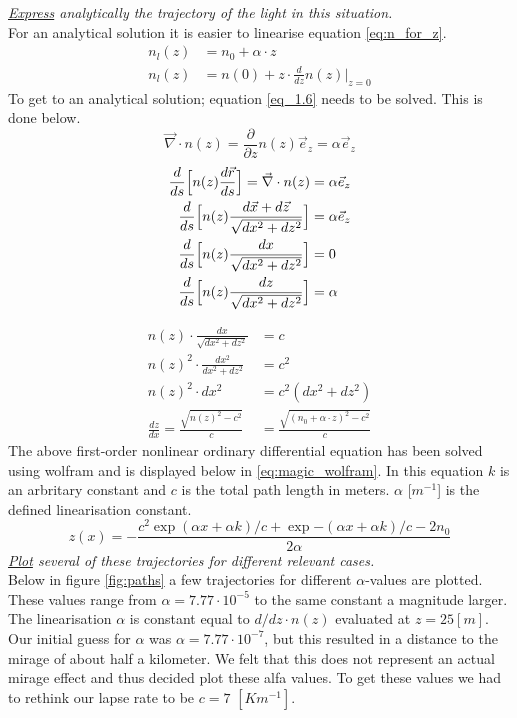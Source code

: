 \documentclass{article}
\begin{document}
\textit{\underline{Express} analytically the trajectory of the light in this situation.}\\
For an analytical solution it is easier to linearise equation \ref{eq:n_for_z}.
\begin{align*}
	n_l(z) &= n_0 + \alpha \cdot z\\
	n_l(z) &= n(0) +z \cdot \frac{d}{dz}n(z)\rvert_{z=0}
\end{align*}
To get to an analytical solution; equation \ref{eq_1.6} needs to be solved. This is done below.
\begin{equation*}
	\vec{\nabla} \cdot n(z) = \frac{\partial}{\partial z}n(z) \vec{e}_z = \alpha \vec{e}_z
\end{equation*}
\begin{align*}
	\frac{d}{ds} \Bigl[n(z)\frac{d\vec{r}}{ds}\Bigr] = \vec{\nabla}\cdot n(z) &= \alpha \vec{e}_z\\
	\frac{d}{ds} \Bigl[n(z)\frac{d\vec{x}+d\vec{z}}{\sqrt{dx^2 + dz^2}}\Bigr] &= \alpha \vec{e}_z\\
	\frac{d}{ds} \Bigl[n(z)\frac{dx}{\sqrt{dx^2 + dz^2}}\Bigr] &= 0\\
	\frac{d}{ds} \Bigl[n(z)\frac{dz}{\sqrt{dx^2 + dz^2}}\Bigr] &= \alpha\\
\end{align*}

\begin{align*}
	n(z)\cdot \frac{dx}{\sqrt{dx^2 + dz^2}} &= c\\
	n(z)^2 \cdot \frac{dx^2}{dx^2 + dz^2} &= c^2\\
	n(z)^2 \cdot dx^2 &= c^2(dx^2 + dz^2)\\
	\frac{dz}{dx} = \frac{\sqrt{n(z)^2 -c^2}}{c} &= \frac{\sqrt{(n_0+\alpha\cdot z)^2 -c^2}}{c}
\end{align*}
The above first-order nonlinear ordinary differential equation has been solved using wolfram and is displayed below in \ref{eq:magic_wolfram}. In this equation $k$ is an arbritary constant and $c$ is the total path length in meters. $\alpha$ [$m^{-1}$] is the defined linearisation constant.
\begin{equation}
	z(x)=-\frac{c^2 \exp{(\alpha x + \alpha k)/c}+\exp{-(\alpha x + \alpha k)/c}-2n_0}{2 \alpha}
	\label{eq:magic_wolfram}
\end{equation}
\textit{\underline{Plot} several of these trajectories for different relevant cases.}\\

Below in figure \ref{fig:paths} a few trajectories for different $\alpha$-values are plotted. These values range from $\alpha = 7.77 \cdot 10^{-5}$ to the same constant a magnitude larger. The linearisation $\alpha$ is constant equal to $d/dz \cdot n(z)$ evaluated at $z=25 [m]$. Our initial guess for $\alpha$ was $\alpha = 7.77 \cdot 10^{-7}$, but this resulted in a distance to the mirage of about half a kilometer. We felt that this does not represent an actual mirage effect and thus decided plot these alfa values. To get these values we had to rethink our lapse rate to be $c = 7$ $[Km^{-1}]$.\\
\end{document}
